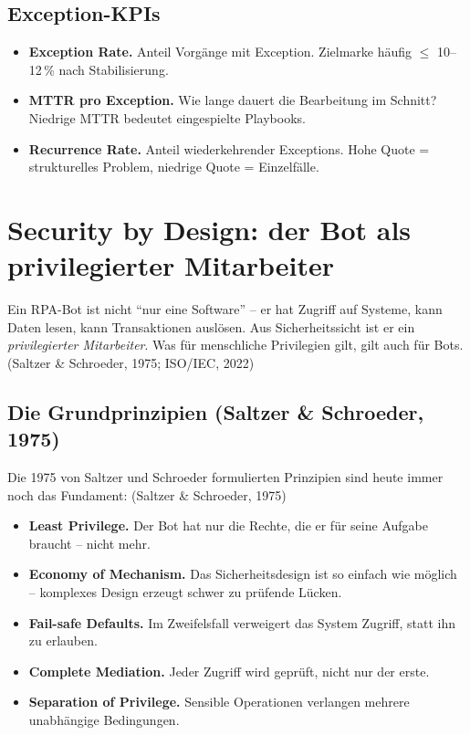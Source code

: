 \documentclass[11pt,a4paper,oneside]{article}
\newcommand{\fachbegriff}[1]{\textbf{#1}}
\newcommand{\quelle}[1]{{\footnotesize\color{lpGray}(#1)}}
\begin{document}
\subsection{Exception-KPIs}

\begin{itemize}
  \item \fachbegriff{Exception Rate.} Anteil Vorgänge mit Exception. Zielmarke häufig $\leq$ 10--12\,\% nach Stabilisierung.
  \item \fachbegriff{MTTR pro Exception.} Wie lange dauert die Bearbeitung im Schnitt? Niedrige MTTR bedeutet eingespielte Playbooks.
  \item \fachbegriff{Recurrence Rate.} Anteil wiederkehrender Exceptions. Hohe Quote = strukturelles Problem, niedrige Quote = Einzelfälle.
\end{itemize}

\section{Security by Design: der Bot als privilegierter Mitarbeiter}

Ein RPA-Bot ist nicht ``nur eine Software'' -- er hat Zugriff auf Systeme, kann Daten lesen, kann Transaktionen auslösen. Aus Sicherheitssicht ist er ein \emph{privilegierter Mitarbeiter}. Was für menschliche Privilegien gilt, gilt auch für Bots. \quelle{Saltzer \& Schroeder, 1975; ISO/IEC, 2022}

\subsection{Die Grundprinzipien (Saltzer \& Schroeder, 1975)}

Die 1975 von Saltzer und Schroeder formulierten Prinzipien sind heute immer noch das Fundament: \quelle{Saltzer \& Schroeder, 1975}

\begin{itemize}
  \item \fachbegriff{Least Privilege.} Der Bot hat nur die Rechte, die er für seine Aufgabe braucht -- nicht mehr.
  \item \fachbegriff{Economy of Mechanism.} Das Sicherheitsdesign ist so einfach wie möglich -- komplexes Design erzeugt schwer zu prüfende Lücken.
  \item \fachbegriff{Fail-safe Defaults.} Im Zweifelsfall verweigert das System Zugriff, statt ihn zu erlauben.
  \item \fachbegriff{Complete Mediation.} Jeder Zugriff wird geprüft, nicht nur der erste.
  \item \fachbegriff{Separation of Privilege.} Sensible Operationen verlangen mehrere unabhängige Bedingungen.
\end{itemize}
\end{document}
